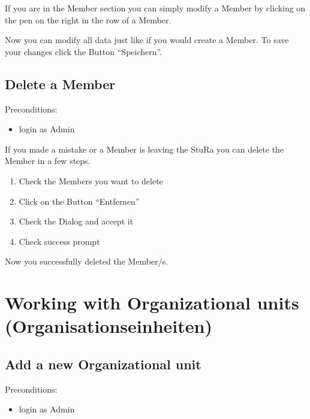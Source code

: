 \documentclass[letterpaper,10pt,english]{sphinxmanual}
\begin{document}
If you are in the Member section you can simply modify a Member by
clicking on the pen on the right in the row of a Member.

\noindent{}

Now you can modify all data just like if you would create a Member.
To save your changes click the Button “Speichern”.


\subsection{Delete a Member}
\label{\detokenize{masterUserDoc:delete-a-member}}
Pre\sphinxhyphen{}conditions:
\begin{itemize}
\item {} 
login as Admin

\end{itemize}

If you made a mistake or a Member is leaving the StuRa you can delete
the Member in a few steps.
\begin{enumerate}
%
\item {} 
Check the Members you want to delete

\item {} 
Click on the Button “Entfernen”

\item {} 
Check the Dialog and accept it

\item {} 
Check success prompt

\end{enumerate}

\noindent{}

\noindent{}

\noindent{}

Now you successfully deleted the Member/s.


\section{Working with Organizational units (Organisationseinheiten)}
\label{\detokenize{masterUserDoc:working-with-organizational-units-organisationseinheiten}}

\subsection{Add a new Organizational unit}
\label{\detokenize{masterUserDoc:add-a-new-organizational-unit}}
Pre\sphinxhyphen{}conditions:
\begin{itemize}
\item {} 
login as Admin

\end{itemize}
\end{document}
